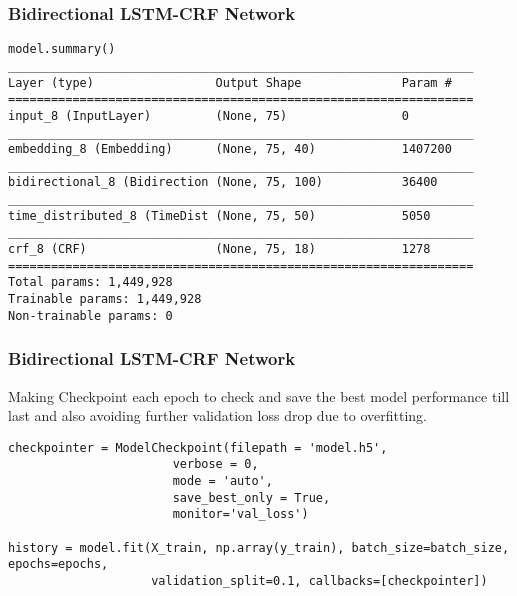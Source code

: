 \begin{frame}[fragile]\frametitle{Bidirectional LSTM-CRF Network}
\begin{lstlisting}
model.summary()
_________________________________________________________________
Layer (type)                 Output Shape              Param #   
=================================================================
input_8 (InputLayer)         (None, 75)                0         
_________________________________________________________________
embedding_8 (Embedding)      (None, 75, 40)            1407200   
_________________________________________________________________
bidirectional_8 (Bidirection (None, 75, 100)           36400     
_________________________________________________________________
time_distributed_8 (TimeDist (None, 75, 50)            5050      
_________________________________________________________________
crf_8 (CRF)                  (None, 75, 18)            1278      
=================================================================
Total params: 1,449,928
Trainable params: 1,449,928
Non-trainable params: 0
\end{lstlisting}
\end{frame}

\begin{frame}[fragile]\frametitle{Bidirectional LSTM-CRF Network}
Making Checkpoint each epoch to check and save the best model performance till last and also avoiding further validation loss drop due to overfitting.

\begin{lstlisting}
checkpointer = ModelCheckpoint(filepath = 'model.h5',
                       verbose = 0,
                       mode = 'auto',
                       save_best_only = True,
                       monitor='val_loss')
											 
history = model.fit(X_train, np.array(y_train), batch_size=batch_size, epochs=epochs,
                    validation_split=0.1, callbacks=[checkpointer])											 
\end{lstlisting}
\end{frame}


